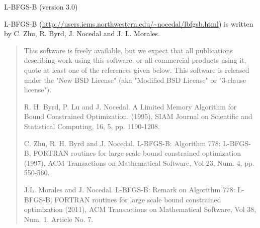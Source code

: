 \documentclass[a4paper,11pt,oneside,english]{sphinxmanual}
\begin{document}
\vspace{2ex}

{\large L-BFGS-B (version 3.0)}

L-BFGS-B (\url{http://users.iems.northwestern.edu/~nocedal/lbfgsb.html})
is written by C. Zhu, R. Byrd, J. Nocedal and J. L. Morales. 

\begin{quote}
   This software is freely available, but we expect that all publications 
   describing work using this software, or all commercial products using 
   it, quote at least one of the references given below. This software is 
   released under the "New BSD License" (aka "Modified BSD License" or 
   "3-clause license"). 

   R. H. Byrd, P. Lu and J. Nocedal. A Limited Memory Algorithm for Bound Constrained Optimization, (1995), SIAM Journal on Scientific and Statistical Computing, 16, 5, pp. 1190-1208.

   C. Zhu, R. H. Byrd and J. Nocedal. L-BFGS-B: Algorithm 778: L-BFGS-B, FORTRAN routines for large scale bound constrained optimization (1997), ACM Transactions on Mathematical Software, Vol 23, Num. 4, pp. 550-560.

   J.L. Morales and J. Nocedal. L-BFGS-B: Remark on Algorithm 778: L-BFGS-B, FORTRAN routines for large scale bound constrained optimization (2011), ACM Transactions on Mathematical Software, Vol 38, Num. 1, Article No. 7.

\end{quote}

\vspace{3ex}

\tableofcontents

\pagestyle{normal}
\label{\detokenize{index::doc}}
\end{document}
